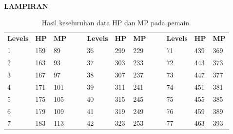 \begin{center}
\Large\textbf{LAMPIRAN}
\end{center}
\label{sec:chap6_attachment}

\begin{table}[!h]
	\centering
	\caption{Hasil keseluruhan data HP dan MP pada pemain.}
	\label{tb:player_hp_mp_all}
	\begin{tabular}{|l|l|l|ll|l|l|l|lllll}
		\cline{1-3} \cline{6-8} \cline{11-13}
		\multicolumn{1}{|c|}{\cellcolor[HTML]{C0C0C0}\textbf{Levels}} & \multicolumn{1}{c|}{\cellcolor[HTML]{C0C0C0}\textbf{HP}} & \multicolumn{1}{c|}{\cellcolor[HTML]{C0C0C0}\textbf{MP}} & \multicolumn{1}{c}{} & \multicolumn{1}{c|}{} & \multicolumn{1}{c|}{\cellcolor[HTML]{C0C0C0}\textbf{Levels}} & \multicolumn{1}{c|}{\cellcolor[HTML]{C0C0C0}\textbf{HP}} & \multicolumn{1}{c|}{\cellcolor[HTML]{C0C0C0}\textbf{MP}} & \multicolumn{1}{c}{} & \multicolumn{1}{c|}{} & \multicolumn{1}{c|}{\cellcolor[HTML]{C0C0C0}\textbf{Levels}} & \multicolumn{1}{c|}{\cellcolor[HTML]{C0C0C0}\textbf{HP}} & \multicolumn{1}{c|}{\cellcolor[HTML]{C0C0C0}\textbf{MP}} \\ \cline{1-3} \cline{6-8} \cline{11-13} 
		1 & 159 & 89 &  &  & 36 & 299 & 229 &  & \multicolumn{1}{l|}{} & \multicolumn{1}{l|}{71} & \multicolumn{1}{l|}{439} & \multicolumn{1}{l|}{369} \\ \cline{1-3} \cline{6-8} \cline{11-13} 
		2 & 163 & 93 &  &  & 37 & 303 & 233 &  & \multicolumn{1}{l|}{} & \multicolumn{1}{l|}{72} & \multicolumn{1}{l|}{443} & \multicolumn{1}{l|}{373} \\ \cline{1-3} \cline{6-8} \cline{11-13} 
		3 & 167 & 97 &  &  & 38 & 307 & 237 &  & \multicolumn{1}{l|}{} & \multicolumn{1}{l|}{73} & \multicolumn{1}{l|}{447} & \multicolumn{1}{l|}{377} \\ \cline{1-3} \cline{6-8} \cline{11-13} 
		4 & 171 & 101 &  &  & 39 & 311 & 241 &  & \multicolumn{1}{l|}{} & \multicolumn{1}{l|}{74} & \multicolumn{1}{l|}{451} & \multicolumn{1}{l|}{381} \\ \cline{1-3} \cline{6-8} \cline{11-13} 
		5 & 175 & 105 &  &  & 40 & 315 & 245 &  & \multicolumn{1}{l|}{} & \multicolumn{1}{l|}{75} & \multicolumn{1}{l|}{455} & \multicolumn{1}{l|}{385} \\ \cline{1-3} \cline{6-8} \cline{11-13} 
		6 & 179 & 109 &  &  & 41 & 319 & 249 &  & \multicolumn{1}{l|}{} & \multicolumn{1}{l|}{76} & \multicolumn{1}{l|}{459} & \multicolumn{1}{l|}{389} \\ \cline{1-3} \cline{6-8} \cline{11-13} 
		7 & 183 & 113 &  &  & 42 & 323 & 253 &  & \multicolumn{1}{l|}{} & \multicolumn{1}{l|}{77} & \multicolumn{1}{l|}{463} & \multicolumn{1}{l|}{393} \\ \cline{1-3} \cline{6-8} \cline{11-13} 

\end{tabular}
\end{table}
